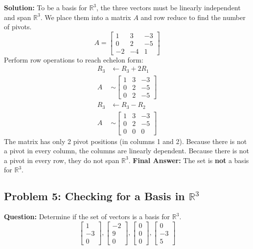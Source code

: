 \documentclass[12pt]{article}
\begin{document}
\textbf{Solution:}
To be a basis for $\mathbb{R}^3$, the three vectors must be linearly independent and span $\mathbb{R}^3$. We place them into a matrix $A$ and row reduce to find the number of pivots.
\[ A = \begin{bmatrix} 1 & 3 & -3 \\ 0 & 2 & -5 \\ -2 & -4 & 1 \end{bmatrix} \]
Perform row operations to reach echelon form:
\begin{align*}
R_3 &\leftarrow R_3 + 2R_1 \\
A &\sim \begin{bmatrix} 1 & 3 & -3 \\ 0 & 2 & -5 \\ 0 & 2 & -5 \end{bmatrix} \\
R_3 &\leftarrow R_3 - R_2 \\
A &\sim \begin{bmatrix} 1 & 3 & -3 \\ 0 & 2 & -5 \\ 0 & 0 & 0 \end{bmatrix}
\end{align*}
The matrix has only 2 pivot positions (in columns 1 and 2). Because there is not a pivot in every column, the columns are linearly dependent. Because there is not a pivot in every row, they do not span $\mathbb{R}^3$. 
\textbf{Final Answer:} The set is \textbf{not} a basis for $\mathbb{R}^3$.

\subsection{Problem 5: Checking for a Basis in $\mathbb{R}^3$}
\textbf{Question:} Determine if the set of vectors is a basis for $\mathbb{R}^3$.
\[ \begin{bmatrix} 1 \\ -3 \\ 0 \end{bmatrix}, \begin{bmatrix} -2 \\ 9 \\ 0 \end{bmatrix}, \begin{bmatrix} 0 \\ 0 \\ 0 \end{bmatrix}, \begin{bmatrix} 0 \\ -3 \\ 5 \end{bmatrix} \]
\end{document}
